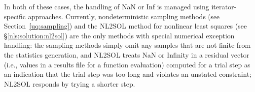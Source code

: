 In both of these cases, the handling of NaN or Inf is managed using
iterator-specific approaches.  Currently, nondeterministic sampling
methods (see Section~\ref{uq:sampling}) and the NL2SOL method
for nonlinear least squares (see \S\ref{nls:solution:nl2sol}) are the only methods with
special numerical exception handling:  the sampling methods simply omit any samples
that are not finite from the statistics generation, and NL2SOL treats
NaN or Infinity in a residual vector (i.e., values in a results file
for a function evaluation) computed for a trial step as an indication
that the trial step was too long and violates an unstated constraint;
NL2SOL responds by trying a shorter step.
